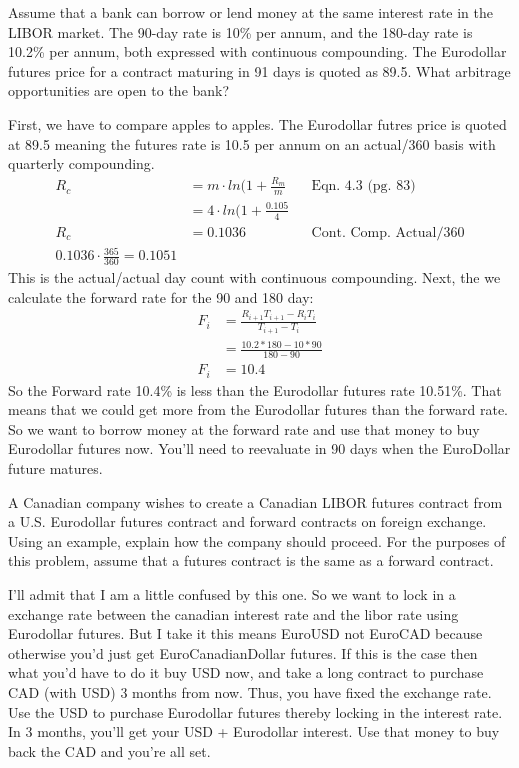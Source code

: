 \documentclass[12pt]{article}
\newenvironment{problem}[3][Problem]{\begin{trivlist}
\item[\hskip \labelsep {\bfseries #1}\hskip \labelsep {\bfseries #2.}]}{\end{trivlist}}
\begin{document}
\newpage 
\begin{problem}{6.28}. Assume that a bank can borrow or lend money at the same interest rate in the LIBOR market.
The 90-day rate is 10\% per annum, and the 180-day rate is 10.2\% per annum, both expressed
with continuous compounding. The Eurodollar futures price for a contract maturing in 91
days is quoted as 89.5. What arbitrage opportunities are open to the bank? 

First, we have to compare apples to apples. The Eurodollar futres price is quoted at 89.5 meaning the futures rate is 10.5 per annum  on an actual/360 basis with quarterly compounding. 
\begin{align*}
R_c &= m \cdot ln(1+\frac{R_m}{m} && \text{Eqn. 4.3 (pg. 83)} \\
&= 4 \cdot ln(1 + \frac{0.105}{4} \\ 
R_c &= 0.1036  && \text{Cont. Comp. Actual/360} \\
0.1036 \cdot \frac{365}{360} = 0.1051 
\end{align*}
This is the actual/actual day count with continuous compounding. Next, the we calculate the forward rate for the 90 and 180 day:
\begin{align*}
F_i &= \frac{R_{i+1}T_{i+1} - R_iT_i}{T_{i+1}-T_i} \\
&= \frac{10.2*180 - 10*90}{180-90}\\
F_i &= 10.4
\end{align*}
So the Forward rate 10.4\% is less than the Eurodollar futures rate 10.51\%. That means that we could get more from the Eurodollar futures than the forward rate. So we want to borrow money at the forward rate and use that money to buy Eurodollar futures now. You\rq{}ll need to reevaluate in 90 days when the EuroDollar future matures. 
\end{problem}

\newpage
\begin{problem}{6.29}. A Canadian company wishes to create a Canadian LIBOR futures contract from a U.S.
Eurodollar futures contract and forward contracts on foreign exchange. Using an example,
explain how the company should proceed. For the purposes of this problem, assume that a
futures contract is the same as a forward contract. 


I\rq{}ll admit that I am a little confused by this one. So we want to lock in a exchange rate between the canadian interest rate and the libor rate using Eurodollar futures. But I take it this means EuroUSD not EuroCAD because otherwise you\rq{}d just get EuroCanadianDollar futures. If this is the case then what you\rq{}d have to do it buy USD now, and take a long contract to purchase CAD (with USD) 3 months from now. Thus, you have fixed the exchange rate. Use the USD to purchase Eurodollar futures thereby locking in the interest rate. In 3 months, you\rq{}ll get your USD + Eurodollar interest. Use that money to buy back the CAD and you\rq{}re all set. 
\end{problem}
\end{document}

